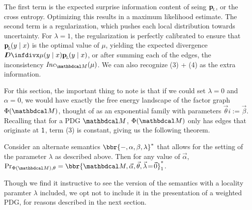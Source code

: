 The first term is the expected surprise information content of seing $\mathbf{p}_{\!_{L}\!}$, or the cross entropy. Optimizing this results in a maximum likelihood estimate. The second term is a regularization, which pushes each local distribution towards uncertainty. For $\lambda = 1$, the regularization is perfectly calibrated to ensure that $\mathbf{p}_{\!_{L}\!}(y \mid x)$ is the optimal value of $\mu$, yielding the expected divergence $\kldiv{\mu(y\mid x)}{\bp(y\mid x)}$, or after summing each of the edges, the inconsistency $\Inc_{\dg M}( \mu)$. We can also recognize (3) + (4) as the extra information.

For this section, the important thing to note is that if we could set $\lambda = 0$ and $\alpha = 0$, we would have exactly the free energy landscape of the factor graph $\Phi(\dg M)$, thought of as an exponential family with parameters $\vec \theta i:= \vec \beta$. Recalling that for a PDG $\dg M$, $\Phi(\dg M)$ only has edges that originate at $\sf 1$, term (3) is constant, giving us the following theorem.

\begin{theorem}
	Consider an alternate semantics $\bbr{-, \alpha, \beta, \lambda}^*$ that allows for the setting of the parameter $\lambda$ as described above. Then for any value of $\vec\alpha$, $\Pr_{\Phi(\dg M),\theta} = \bbr{\dg M, \vec{\alpha}, \vec{\theta}, \vec\lambda \!=\! \vec 0 }^*_1$.
\end{theorem}

Though we find it instructive to see the version of the semantics with a locality paramter $\lambda$ included, we opt not to include it in the presentation of a weighted PDG, for reasons described in the next section.

